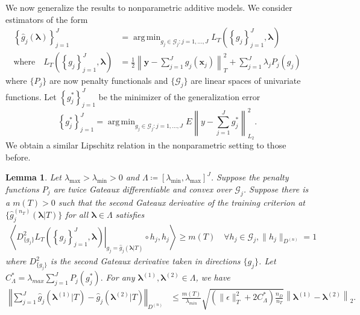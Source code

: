 \documentclass[12pt]{article} %
\newtheorem{lemma}{Lemma}
\theoremstyle{definition}
\DeclareMathOperator*{\argmin}{arg\,min}
\begin{document}
We now generalize the results to nonparametric additive models. We consider estimators of the form
\begin{align}
\label{eq:train_crit_nonparam}
\left\{ \hat{g}_j( \boldsymbol \lambda) \right \}_{j=1}^J &= 
\argmin_{g_j\in \mathcal{G}_j: j=1,...,J}  L_T\left (\left \{ g_j \right \}_{j=1}^J, \boldsymbol{\lambda} \right ) \\
\text{where} \quad L_T \left (\left \{ g_j \right \}_{j=1}^J, \boldsymbol{\lambda} \right ) &=
\frac{1}{2} \left \| \boldsymbol y -  \sum_{j=1}^J g_j(\boldsymbol x_j) \right \|^2_T 
+ \sum_{j=1}^J \lambda_j P_j(g_j)
\end{align}
where $\{P_j\}$ are now penalty functionals and $\{\mathcal{G}_j\}$ are linear spaces of univariate functions.
Let $\left\{ g_j^* \right \}_{j=1}^J$ be the minimizer of the generalization error
\begin{equation}
\left\{ g_j^* \right \}_{j=1}^J = \argmin_{g_j \in \mathcal{G}_j: j=1,...,J}
E \left \| y - \sum_{j=1}^J g_j^* \right \|^2_{L_2}.
\end{equation}
We obtain a similar Lipschitz relation in the nonparametric setting to those before.
\begin{lemma}
	\label{lemma:nonparam_smooth}
	Let $\lambda_{\max} > \lambda_{\min} > 0 $ and $\Lambda \coloneqq [\lambda_{\min}, \lambda_{\max}]^J$.
	Suppose the penalty functions $P_{j}$ are twice Gateaux differentiable and convex over $\mathcal{G}_j$.
	Suppose there is a $m(T) > 0$ such that the second Gateaux derivative of the training criterion at $\{\hat{g}^{(n_T)}_j( \boldsymbol{\lambda} | T)\}$ for all $\boldsymbol{\lambda} \in \Lambda$ satisfies
	\begin{align}
	\left \langle 
	\left . D^2_{\{g_j\}} L_T \left ( \left \{ g_j \right \}_{j=1}^J, \boldsymbol{\lambda} \right ) \right |_{g_j= \hat{g}_j( \boldsymbol{\lambda} | T) }
	\circ h_j, h_j
	\right \rangle 
	\ge m(T)
	\quad \forall h_j \in \mathcal{G}_j,  \|h_j \|_{D^{(n)}} = 1
	\label{eq:gateuax}
	\end{align}
	where $D^2_{\{g_j\}}$ is the second Gateaux derivative taken in directions $\{g_j\}$.
	Let $
	C_{\Lambda}^*= \lambda_{max}\sum_{j=1}^{J} P_{j}(g^*_j).
	$
	For any $\boldsymbol{\lambda}^{(1)}, \boldsymbol{\lambda}^{(2)} \in \Lambda$, we have
	\begin{align}
	\label{eq:nonparam_lipshitz_thrm}
	\left\Vert 
	\sum_{j=1}^J \hat{g}_j\left(\boldsymbol{\lambda}^{(1)} |T \right)-\hat{g}_j\left(\boldsymbol{\lambda}^{(2)} |T \right)\right\Vert _{D^{(n)}} & \le
	\frac{m(T)}{\lambda_{min}}
	\sqrt{
		\left(
		\|\epsilon\|_T^2 + 2 C^*_\Lambda
		\right)
		\frac{n_{D}}{n_{T}}
	}
	\left \|\boldsymbol{\lambda}^{(1)}-\boldsymbol{\lambda}^{(2)} \right \|_2.
	\end{align}
\end{lemma}
\end{document}
